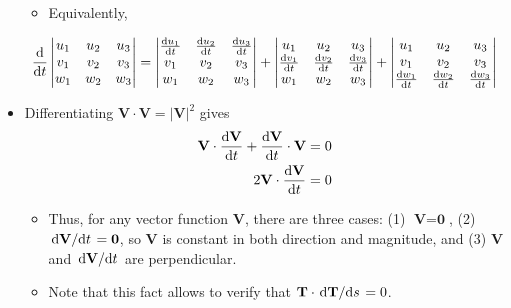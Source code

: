 \documentclass[../main.tex]{subfiles}
\begin{document}
\begin{itemize}
    \begin{itemize}
        \item Equivalently,
    \end{itemize}
    \begin{equation*}
        \dv{t}
        \begin{vmatrix}
            u_1 & u_2 & u_3\\
            v_1 & v_2 & v_3\\
            w_1 & w_2 & w_3\\
        \end{vmatrix}
        =
        \begin{vmatrix}
            \dv{u_1}{t} & \dv{u_2}{t} & \dv{u_3}{t}\\
            v_1 & v_2 & v_3\\
            w_1 & w_2 & w_3\\
        \end{vmatrix}
        +
        \begin{vmatrix}
            u_1 & u_2 & u_3\\
            \dv{v_1}{t} & \dv{v_2}{t} & \dv{v_3}{t}\\
            w_1 & w_2 & w_3\\
        \end{vmatrix}
        +
        \begin{vmatrix}
            u_1 & u_2 & u_3\\
            v_1 & v_2 & v_3\\
            \dv{w_1}{t} & \dv{w_2}{t} & \dv{w_3}{t}\\
        \end{vmatrix}
    \end{equation*}
    \item Differentiating $\textbf{V}\cdot\textbf{V}=|\textbf{V}|^2$ gives
    \begin{align*}
        \textbf{V}\cdot\dv{\textbf{V}}{t}+\dv{\textbf{V}}{t}\cdot\textbf{V} &= 0\\
        2\textbf{V}\cdot\dv{\textbf{V}}{t} &= 0
    \end{align*}
    \begin{itemize}
        \item Thus, for any vector function $\textbf{V}$, there are three cases: (1) $\textbf{V}=\textbf{0}$, (2) $\dv*{\textbf{V}}{t}=\textbf{0}$, so $\textbf{V}$ is constant in both direction and magnitude, and (3) $\textbf{V}$ and $\dv*{\textbf{V}}{t}$ are perpendicular.
        \item Note that this fact allows to verify that $\textbf{T}\cdot\dv*{\textbf{T}}{s}=0$.

\end{itemize}
\end{itemize}
\end{document}
